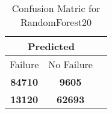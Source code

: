 \begin{table}[] 
\caption{Confusion Matric for RandomForest20} 
\label{Table: Prediction Accuracy-DMDRandomForest20OnlySunEKF-ignoreReflection100.9EKF-top2-Reflection} 
\centering 
\begin{tabular} 
 {@{}ccc@{}} 
\toprule 
\multicolumn{2}{c}{\textbf{Predicted}}
 \\ \midrule 
\multicolumn{1}{|c|}{Failure} & 
\multicolumn{1}{c|}{No Failure}
 \\ \midrule 
\multicolumn{1}{|c|}{\color{green}\textbf{84710}} & 
\multicolumn{1}{c|}{\color{red}\textbf{9605}}
 \\ \midrule 
\multicolumn{1}{|c|}{\color{red}\textbf{13120}} & 
\multicolumn{1}{c|}{\color{green}\textbf{62693}}
 \\ \bottomrule 
\end{tabular} 
\end{table} 
